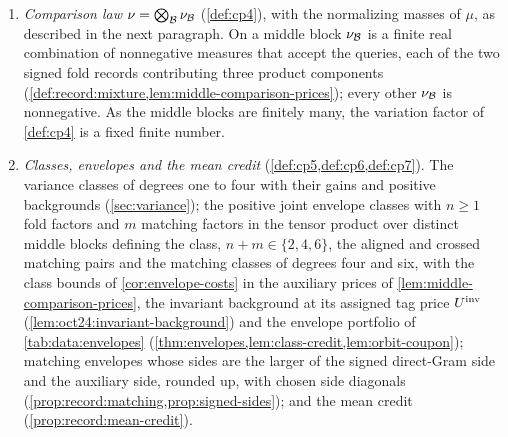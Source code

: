 \begin{definition}
\begin{enumerate}[label=(\alph*)]
 nonaccepting one-layer fold components on the reserved diagonal), $E_{\rm fold}$ (the two
 reserved-folded matching components), $E_{\rm add}$, the polarization
 correction $G$, the reserved half diagonals $H$, and the one-stage repair
 $E_{\rm new}$ of $E_{\rm fold}+E_{\rm add}$ give, with $\rho$ the intermediate law obtained from $\mu$ by polarization before the one-stage repair, and $\Nbrz$ the auxiliary dominator of \cref{def:cp3},
 \begin{gather*}
  \rho=\mu-F_{\rm fold}+E_{\rm add}+G,\qquad
  \lambda=\rho+\delta_E,\qquad \delta_E=E_{\rm new}-E_{\rm fold}-E_{\rm add},\\
  \Nbr=\lambda+F_{\rm fold}+H,\qquad \Nbrz=\mu+E_{\rm add}+G+H
 \end{gather*}
 (\cref{def:record:frame}). The record differences of $\delta_E$ of type $E_0$, whose
 sharp (O2) bound is at their first-coordinate cut $\vartheta_1$, form one of
 the two tags of (CP2)(b), and those of type $E_1$, whose sharp bound is at
 $\vartheta_2$, the other. Off the middle blocks,
 $\lambda_{\Blk}=\Nbr_{\Blk}=\mu_{\Blk}$.
\item \emph{Comparison law} $\nu=\bigotimes_{\mathcal B}\nu_{\mathcal B}$ (\cref{def:cp4}),
 with the normalizing masses of $\mu$, as described in the next paragraph. On a
 middle block $\nu_{\mathcal B}$ is a finite real combination of nonnegative measures
 that accept the queries, each of the two signed fold records contributing
 three product components (\cref{def:record:mixture,lem:middle-comparison-prices});
 every other $\nu_{\mathcal B}$ is nonnegative. As the middle blocks are finitely
 many, the variation factor of \cref{def:cp4} is a fixed finite number.
\item \emph{Classes, envelopes and the mean credit}
 (\cref{def:cp5,def:cp6,def:cp7}). The variance classes of degrees one to four
 with their gains and positive backgrounds (\cref{sec:variance}); the positive
 joint envelope classes with $n\ge1$ fold factors and $m$ matching
 factors in the tensor product over distinct middle blocks defining the class,
 $n+m\in\{2,4,6\}$, the aligned and crossed matching pairs and the matching
 classes of degrees four and six, with the class bounds of
 \cref{cor:envelope-costs} in the auxiliary prices of
 \cref{lem:middle-comparison-prices}, the invariant background at its assigned
 tag price $U^{\mathrm{inv}}$ (\cref{lem:oct24:invariant-background}) and the envelope
 portfolio of \cref{tab:data:envelopes}
 (\cref{thm:envelopes,lem:class-credit,lem:orbit-coupon});
 matching envelopes whose sides are the larger of the signed direct-Gram side
 and the auxiliary side, rounded up, with chosen side diagonals
 (\cref{prop:record:matching,prop:signed-sides}); and the mean credit
 (\cref{prop:record:mean-credit}).
\end{enumerate}
\end{definition}

